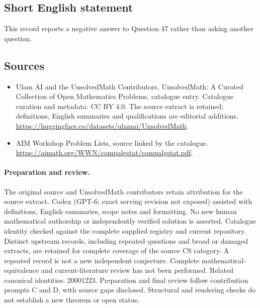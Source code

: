 \documentclass[11pt]{article}
\begin{document}
\subsection{Short English statement}
This record reports a negative answer to Question 47 rather than asking another question.
\subsection{Sources}
\begin{itemize}
\item[\hypertarget{source:statement:1}{S1}] Ulam AI and the UnsolvedMath Contributors, UnsolvedMath: A Curated Collection of Open Mathematics Problems, catalogue entry. Catalogue curation and metadata: CC BY 4.0. The source extract is retained; definitions, English summaries and qualifications are editorial additions.
\url{https://huggingface.co/datasets/ulamai/UnsolvedMath}.
\item[\hypertarget{source:statement:2}{S2}] AIM Workshop Problem Lists, source linked by the catalogue.
\url{https://aimath.org/WWN/compalgstat/compalgstat.pdf}.
\end{itemize}
\paragraph{Preparation and review.}
The original source and UnsolvedMath contributors retain attribution for the source extract. Codex (GPT-6; exact serving revision not exposed) assisted with definitions, English summaries, scope notes and formatting. No new human mathematical authorship or independently verified solution is asserted. Catalogue identity checked against the complete supplied registry and current repository. Distinct upstream records, including repeated questions and broad or damaged extracts, are retained for complete coverage of the source CS category. A repeated record is not a new independent conjecture. Complete mathematical-equivalence and current-literature review has not been performed. Related canonical identities: 20001223. Preparation and final review follow contribution prompts C and D, with source gaps disclosed. Structural and rendering checks do not establish a new theorem or open status.
\label{end:statement}
\end{document}
